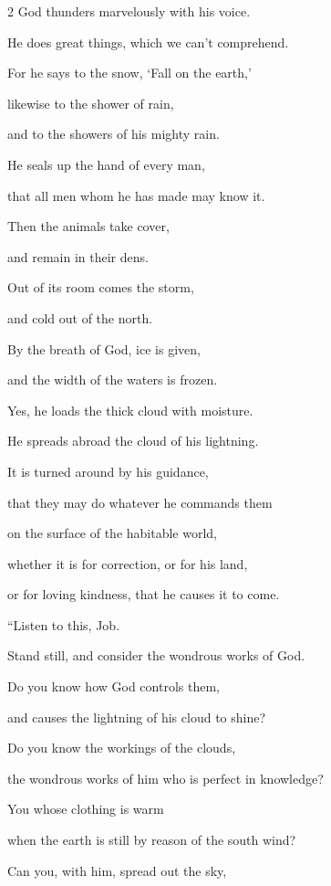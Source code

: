 \begin{multicols}{2}
	\myverse{}God thunders marvelously with his voice.
	
	He does great things, which we can’t comprehend.
	
	\myverse{}For he says to the snow, ‘Fall on the earth,’
	
	likewise to the shower of rain,
	
	and to the showers of his mighty rain.
	
	\myverse{}He seals up the hand of every man,
	
	that all men whom he has made may know it.
	
	\myverse{}Then the animals take cover,
	
	and remain in their dens.
	
	\myverse{}Out of its room comes the storm,
	
	and cold out of the north.
	
	\myverse{}By the breath of God, ice is given,
	
	and the width of the waters is frozen.
	
	\myverse{}Yes, he loads the thick cloud with moisture.
	
	He spreads abroad the cloud of his lightning.
	
	\myverse{}It is turned around by his guidance,
	
	that they may do whatever he commands them
	
	on the surface of the habitable world,
	
	\myverse{}whether it is for correction, or for his land,
	
	or for loving kindness, that he causes it to come.
	
	\vspace{\baselineskip}
	
	\myverse{}“Listen to this, Job.
	
	Stand still, and consider the wondrous works of God.
	
	\myverse{}Do you know how God controls them,
	
	and causes the lightning of his cloud to shine?
	
	\myverse{}Do you know the workings of the clouds,
	
	the wondrous works of him who is perfect in knowledge?
	
	\myverse{}You whose clothing is warm
	
	when the earth is still by reason of the south wind?
	
	\myverse{}Can you, with him, spread out the sky,
	

\end{multicols}
